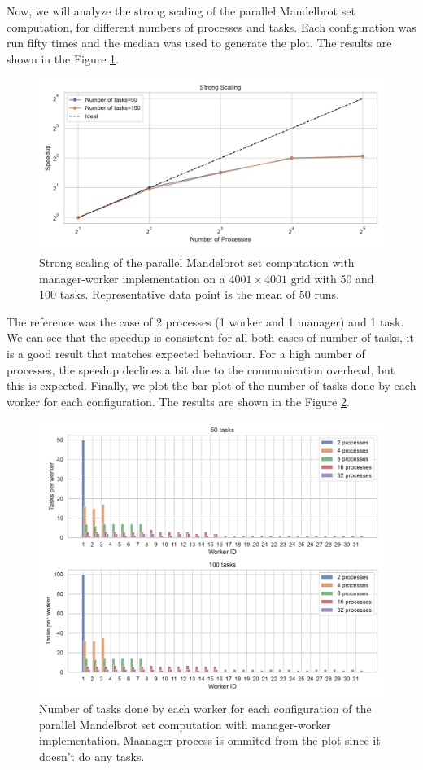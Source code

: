 \documentclass[unicode,11pt,a4paper,oneside,numbers=endperiod,openany]{scrartcl}
\begin{document}
Now, we will analyze the strong scaling of the parallel Mandelbrot set
computation, for different numbers of processes and tasks. Each configuration
was run fifty times and the median was used to generate the plot.
The results are shown in the Figure \ref{fig:mandelbrot}.
\begin{figure}[h!]
    \centering
    \includegraphics[width=\textwidth]{../hpc_python/ManagerWorker/strong_scaling_plot.pdf}
    \caption{Strong scaling of the parallel Mandelbrot set computation with
    manager-worker implementation on a $4001 \times 4001$ grid with 50 and 100
    tasks. Representative data point is the mean of 50 runs.}
    \label{fig:mandelbrot}
\end{figure}
The reference was the case of 2 processes (1 worker and 1 manager) and 1 task.
We can see that the speedup is consistent for all both cases of number of tasks,
it is a good result that matches expected behaviour. For a high number of
processes, the speedup declines a bit due to the communication overhead, but
this is expected.
Finally, we plot the bar plot of the number of tasks done by each worker for
each configuration. The results are shown in the Figure \ref{fig:tasks}.
\begin{figure}[h!]
    \centering
    \includegraphics[width=\textwidth]{../hpc_python/ManagerWorker/tasks_per_worker.pdf}
    \caption{Number of tasks done by each worker for each configuration of the
    parallel Mandelbrot set computation with manager-worker implementation.
    Maanager process is ommited from the plot since it doesn't do any tasks.}
    \label{fig:tasks}
\end{figure}
\end{document}
